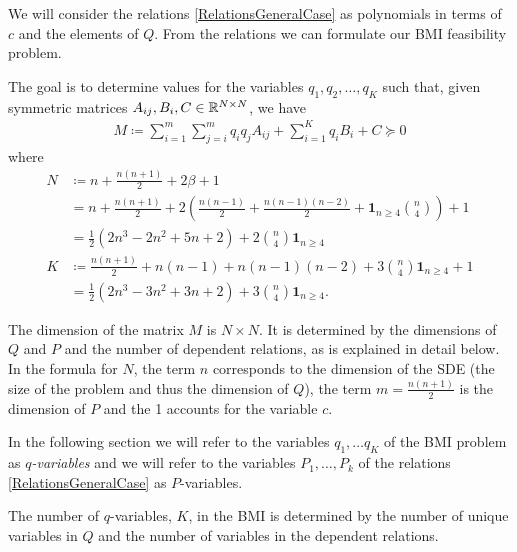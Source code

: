 \documentclass[a4paper,12pt,twoside,BCOR=10mm]{scrbook}
\begin{document}
We will consider the relations \eqref{RelationsGeneralCase} as polynomials in terms of $c$ and the elements of $Q$. From the relations we can formulate our BMI feasibility problem.

The goal is to determine values for the variables $q_1, q_2, \ldots, q_K$ such that, given symmetric matrices $A_{ij}, B_i, C \in \mathbb{R}^{N\times N}$, we have
\begin{align}\label{BMIgeneralNotDefinition}
    M \coloneqq \sum_{i = 1}^m \sum_{j = i}^m q_iq_jA_{ij} + \sum_{i = 1}^Kq_iB_i + C \succeq 0
\end{align}
where
\begin{align*}
    N &\coloneqq n + \frac{n(n+1)}{2} + 2\beta + 1\\
    &= n + \frac{n(n+1)}{2} + 2\left(\frac{n(n-1)}{2}+ \frac{n(n-1)(n-2)}{2} + \mathbf{1}_{n\geq4}\binom{n}{4}\right) + 1\\
    &= \frac{1}{2}(2n^3 - 2n^2 + 5n + 2) + 2\binom{n}{4}\mathbf{1}_{n\geq4}\\
    K &\coloneqq \frac{n(n+1)}{2} + n(n-1) + n(n-1)(n-2) + 3\binom{n}{4}\mathbf{1}_{n\geq 4} + 1\\
    &= \frac{1}{2}(2n^3 - 3n^2 + 3n + 2) + 3\binom{n}{4}\mathbf{1}_{n\geq4}.
\end{align*}

The dimension of the matrix $M$ is $N\times N$. It is determined by the dimensions of $Q$ and $P$ and the number of dependent relations, as is explained in detail below. In the formula for $N$, the term $n$ corresponds to the dimension of the SDE (the size of the problem and thus the dimension of $Q$), the term $m = \frac{n(n + 1)}{2}$ is the dimension of $P$ and the 1 accounts for the variable $c$.

In the following section we will refer to the variables $q_1, \ldots q_K$ of the BMI problem as $q$\textit{-variables} and we will refer to the variables $P_1, \ldots, P_k$ of the relations \eqref{RelationsGeneralCase} as $P$-variables.

The number of $q$-variables, $K$, in the BMI is determined by the number of unique variables in $Q$ and the number of variables in the dependent relations.
\end{document}
